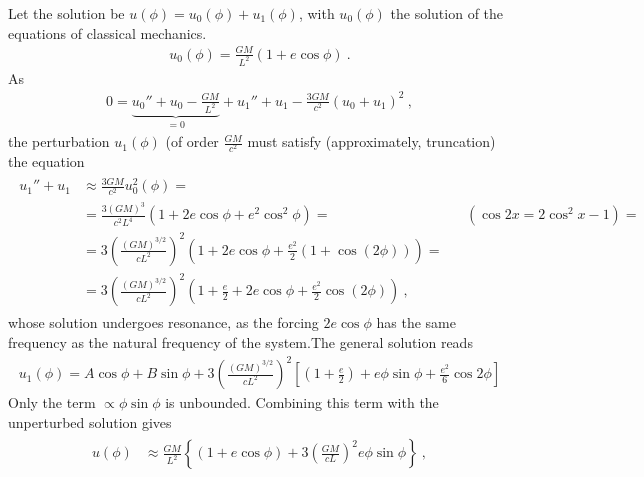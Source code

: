 \documentclass[letterpaper,10pt,english]{jupyterBook}
\begin{document}
\sphinxAtStartPar
Let the solution be \(u(\phi) = u_0(\phi) + u_1(\phi)\), with \(u_0(\phi)\) the solution of the equations of classical mechanics.
\begin{equation*}
\begin{split}u_0(\phi) = \frac{GM}{L^2}(1 + e \cos \phi) \ . \end{split}
\end{equation*}
\sphinxAtStartPar
As
\begin{equation*}
\begin{split}0 = \underbrace{u_0'' + u_0 - \frac{GM}{L^2}}_{=0} + u_1'' + u_1 - \frac{3GM}{c^2} (u_0 + u_1)^2 \ ,\end{split}
\end{equation*}
\sphinxAtStartPar
the perturbation \(u_1(\phi)\) (of order \(\frac{GM}{c^2}\) must satisfy (approximately, truncation) the equation
\begin{equation*}
\begin{split}\begin{aligned}
  u_1'' + u_1
  & \approx \frac{3 GM}{c^2} u_0^2(\phi) = \\
  & = \frac{3 (GM)^3}{c^2 L^4} \left( 1 + 2 e \cos \phi + e^2 \cos^2 \phi \right) = && ( \cos 2 x = 2 \cos^2 x - 1 ) = \\
  & = 3 \left( \frac{(GM)^{3/2}}{ c L^2} \right)^2 \left( 1 + 2 e \cos \phi + \frac{e^2}{2} \left( 1 + \cos ( 2 \phi ) \right) \right) = \\
  & = 3 \left( \frac{(GM)^{3/2}}{ c L^2} \right)^2 \left( 1 + \frac{e}{2} + 2 e \cos \phi + \frac{e^2}{2} \cos ( 2 \phi ) \right) \ ,
\end{aligned}\end{split}
\end{equation*}
\sphinxAtStartPar
whose solution undergoes resonance, as the forcing \(2 e \cos \phi\) has the same frequency as the natural frequency of the system.The general solution reads
\begin{equation*}
\begin{split}u_1(\phi) = A \cos \phi + B \sin \phi + 3 \left( \frac{(GM)^{3/2}}{c L^2} \right)^2 \left[ \left( 1 + \frac{e}{2} \right) + e \phi \sin \phi + \frac{e^2}{6} \cos 2 \phi \right]\end{split}
\end{equation*}
\sphinxAtStartPar
Only the term \(\propto \phi \sin \phi\) is unbounded. Combining this term with the unperturbed solution gives
\begin{equation*}
\begin{split}\begin{aligned}
  u(\phi) 
  & \approx \frac{GM}{L^2} \left\{ ( 1 + e \cos \phi ) + 3 \left( \frac{GM}{cL} \right)^2 e \phi \sin \phi \right\} \ ,
\end{aligned}\end{split}
\end{equation*}
\end{document}
